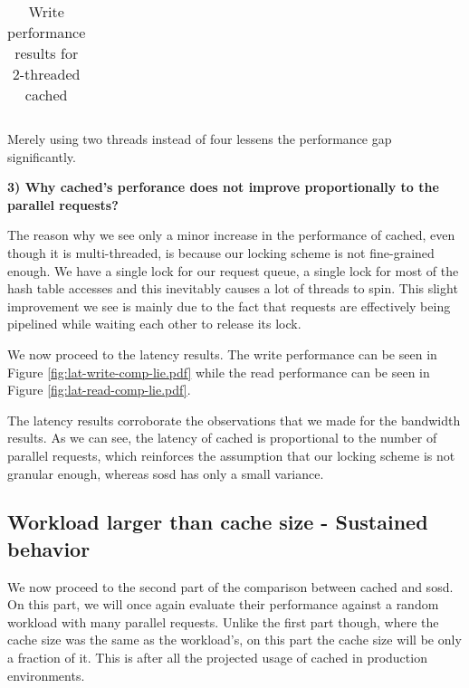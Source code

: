 \begin{table}[H]
	\centering
	\begin{tabular}{ | l | l | l | l | l |}
		\hline
		
	\end{tabular}
	\caption{Write performance results for 2-threaded cached}
	\label{tab:2threads}
\end{table}

Merely using two threads instead of four lessens the performance gap 
significantly.

\textbf{3) Why cached's perforance does not improve proportionally to the 
	parallel requests?}

The reason why we see only a minor increase in the performance of cached, even 
though it is multi-threaded, is because our locking scheme is not fine-grained 
enough. We have a single lock for our request queue, a single lock for most of 
the hash table accesses and this inevitably causes a lot of threads to spin.  
This slight improvement we see is mainly due to the fact that requests are 
effectively being pipelined while waiting each other to release its lock.  

We now proceed to the latency results. The write performance can be seen in 
Figure \ref{fig:lat-write-comp-lie.pdf} while the read performance can be seen 
in Figure \ref{fig:lat-read-comp-lie.pdf}.


The latency results corroborate the observations that we made for the bandwidth 
results. As we can see, the latency of cached is proportional to the number of 
parallel requests, which reinforces the assumption that our locking scheme is 
not granular enough, whereas sosd has only a small variance.

\subsection{Workload larger than cache size - Sustained behavior}
\label{sec:sustained-plot}

We now proceed to the second part of the comparison between cached and sosd.  
On this part, we will once again evaluate their performance against a random 
workload with many parallel requests. Unlike the first part though, where the 
cache size was the same as the workload's, on this part the cache size will be 
only a fraction of it. This is after all the projected usage of cached in
production environments.


